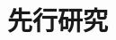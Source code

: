 \documentclass[../main]{subfiles}
\begin{document}
\section{先行研究}
\label{sec:intro_previous-research}
\end{document}
